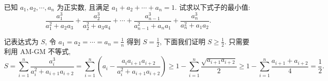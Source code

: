 \begin{prob}
\label{prob:prob-14}
已知 $a_1, a_2, \cdots, a_n$ 为正实数, 且满足 $a_1 + a_2 + \cdots + a_n = 1$.
试求以下式子的最小值:
\[
\frac{a_1^3}{a_1^2 + a_2a_3} + \frac{a_2^3}{a_2^2 + a_3a_4} + \cdots
+ \frac{a_{n-1}^3}{a_{n-1}^2 + a_na_1} + \frac{a_n^3}{a_n^2 + a_1a_2}.
\]
\end{prob}

\begin{soln}
记表达式为 $S$, 令 $a_1 = a_2 = \cdots = a_n = \frac{1}{n}$
得到 $S = \frac{1}{2}$, 下面我们证明 $S \ge \boxed{\tfrac{1}{2}.}$
只需要利用 AM-GM 不等式,
\[
S = \sum_{i=1}^n \frac{a_i^3}{a_i^2 + a_{i+1}a_{i+2}}
  = \sum_{i=1}^n \left(a_i - \frac{a_ia_{i+1}a_{i+2}}{a_i^2 + a_{i+1}a_{i+2}}\right)
  \ge 1 - \sum_{i=1}^n \frac{\sqrt{a_{i+1}a_{i+2}}}{2}
  \ge 1 - \sum_{i=1}^n \frac{a_{i+1} + a_{i+2}}{4}
  = \frac{1}{2}.
\]
\end{soln}
